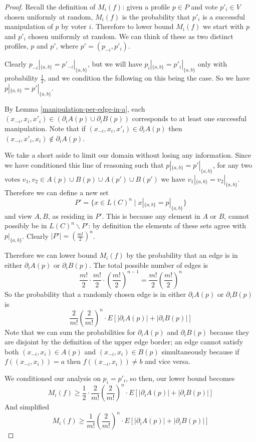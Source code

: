 	\begin{proof}
		Recall the definition of $M_i(f)$: given a profile $p \in P$ and vote $p'_i \in V$ chosen uniformly at random, $M_i(f)$ is the probability that $p'_i$ is a successful manipulation of $p$ by voter $i$. Therefore to lower bound $M_i(f)$ we start with $p$ and $p'_i$ chosen uniformly at random. We can think of these as two distinct profiles, $p$ and $p'$, where $p' = (p_{-i}, p'_i)$.

		Clearly $p_{-i}|_{\{a,b\}} = p'_{-i}|_{\{a,b\}}$, but we will have $p_i|_{\{a,b\}} = p'_i|_{\{a,b\}}$ only with probability $\frac{1}{2}$, and we condition the following on this being the case. So we have $p|_{\{a,b\}} = p'|_{\{a,b\}}$.

		By Lemma \ref{manipulation-per-edge-in-a}, each $(x_{-i}, x_i, x'_i) \in (\partial_i A(p) \cup \partial_i B(p))$ corresponds to at least one successful manipulation. Note that if $(x_{-i}, x_i, x'_i) \in \partial_i A(p)$ then $(x_{-i}, x'_i, x_i) \notin \partial_i A(p)$.

		We take a short aside to limit our domain without losing any information. Since we have conditioned this line of reasoning such that $p|_{\{a,b\}} = p'|_{\{a,b\}}$, for any two votes $v_1, v_2 \in A(p) \cup B(p) \cup A(p') \cup B(p')$ we have $v_1|_{\{a,b\}} = v_2|_{\{a,b\}}$. Therefore we can define a new set
		\[
			P' = \{x \in L(C)^n \mid x|_{\{a,b\}} = p|_{\{a,b\}}\}
		\]
		and view $A, B$, as residing in $P'$. This is because any element in $A$ or $B$, cannot possibly be in $L(C)^n \backslash P'$: by definition the elements of these sets agree with $p|_{\{a,b\}}$. Clearly $|P'| = (\frac{m!}{2})^n$.

		Therefore we can lower bound $M_i(f)$ by the probability that an edge is in either $\partial_i A(p)$ or $\partial_i B(p)$. The total possible number of edges is
		\[
			\frac{m!}{2} \cdot \frac{m!}{2} \cdot \left(\frac{m!}{2}\right)^{n-1} = \frac{m!}{2}\left(\frac{m!}{2}\right)^{n}
		\]
		So the probability that a randomly chosen edge is in either $\partial_i A(p)$ or $\partial_i B(p)$ is
		\[
			\frac{2}{m!} \left(\frac{2}{m!}\right)^{n} \cdot E \left[ |\partial_i A(p)| + |\partial_i B(p)| \right]
		\]
		Note that we can sum the probabilities for $\partial_i A(p)$ and $\partial_i B(p)$ because they are disjoint by the definition of the upper edge border; an edge cannot satisfy both $(x_{-i}, x_i) \in A(p)$ and $(x_{-i}, x_i) \in B(p)$ simultaneously because if $f((x_{-i}, x_i)) = a$ then $f((x_{-i}, x_i)) \ne b$ and vice versa.

		We conditioned our analysis on $p_i = p'_i$, so then, our lower bound becomes
		\[
			M_i(f) \ge \frac{1}{2} \cdot \frac{2}{m!}\left(\frac{2}{m!}\right)^{n} \cdot E \left[ |\partial_i A(p)| + |\partial_i B(p)| \right]
		\]
		And simplified
		\[
			M_i(f) \ge \frac{1}{m!}\left(\frac{2}{m!}\right)^{n} \cdot E \left[ |\partial_i A(p)| + |\partial_i B(p)| \right]
		\]
	\end{proof}

